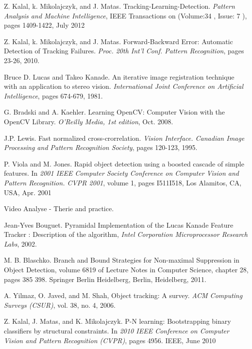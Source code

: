 \newpage{}

\begin{thebibliography}{SMAT}
 Z. Kalal, k. Mikolajczyk, and J. Matas. Tracking-Learning-Detection. \textit{Pattern Analysis and Machine Intelligence}, IEEE Transactions on (Volume:34 , Issue: 7 ), pages 1409-1422, July 2012

 Z. Kalal, k. Mikolajczyk, and J. Matas. Forward-Backward Error: Automatic Detection of Tracking Failures. \textit{Proc. 20th Int'l Conf. Pattern Recognition}, pages 23-26, 2010.

 Bruce D. Lucas and Takeo Kanade. An iterative image registration technique with an application to stereo vision. \textit{International Joint Conference on Artificial Intelligence}, pages 674-679, 1981.

G. Bradski and A. Kaehler. Learning OpenCV: Computer Vision with the OpenCV Library.\textit{ O\textquoteright{}Reilly Media, 1st edition}, Oct. 2008.

 J.P. Lewis. Fast normalized cross-crorrelation. \textit{Vision Interface. Canadian Image Processing and Pattern Recognition Society}, pages 120-123, 1995.

P. Viola and M. Jones. Rapid object detection using a boosted cascade of simple features. In \textit{2001 IEEE Computer Society Conference on Computer Vision and Pattern Recognition. CVPR 2001}, volume 1, pages I\textendash{}511\textendash{}I\textendash{}518, Los Alamitos, CA, USA, Apr. 2001

 Video Analyse - Therie and practice.

 Jean-Yves Bouguet. Pyramidal Implementation of the Lucas Kanade Feature Tracker : Description of the algorithm, \textit{Intel Corporation \textendash{} Microprocessor Research Labs}, 2002.

 M. B. Blaschko. Branch and Bound Strategies for Non-maximal Suppression in Object Detection, volume 6819 of Lecture Notes in Computer Science, chapter 28, pages 385\textendash{} 398. Springer Berlin Heidelberg, Berlin, Heidelberg, 2011.

 A. Yilmaz, O. Javed, and M. Shah, Object tracking: A survey. \textit{ACM Computing Surveys (CSUR)}, vol. 38, no. 4, 2006.

Z. Kalal, J. Matas, and K. Mikolajczyk. P-N learning: Bootstrapping binary classifiers by structural constraints. In \textit{2010 IEEE Conference on Computer Vision and Pattern Recognition (CVPR)}, pages 49\textendash{}56. IEEE, June 2010


\end{thebibliography}
